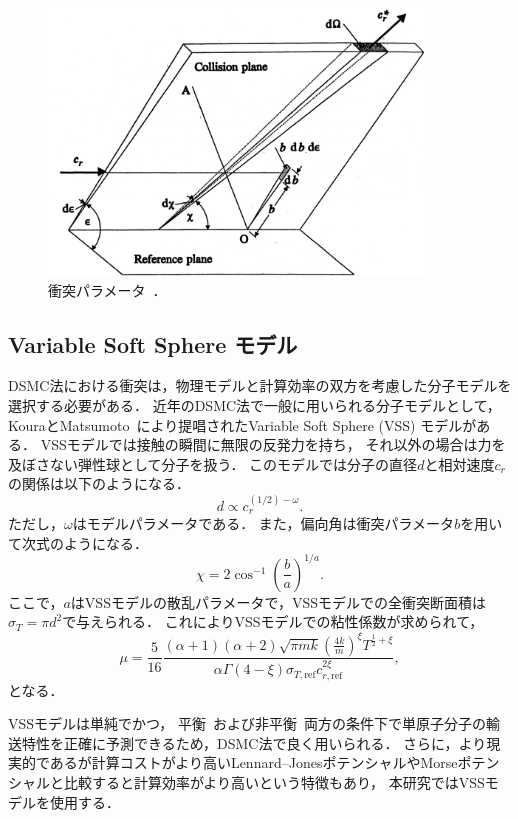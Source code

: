 \begin{figure}
    \centering
    \includegraphics[width=10cm]{fig/dsmc/bird2.jpg}
    \caption{衝突パラメータ~\cite{bird1994molecular}．}
    \label{fig:bird2}
\end{figure}

\subsection{Variable Soft Sphere モデル}
DSMC法における衝突は，物理モデルと計算効率の双方を考慮した分子モデルを選択する必要がある．
近年のDSMC法で一般に用いられる分子モデルとして，
KouraとMatsumoto~\cite{koura1991variable}により提唱されたVariable Soft Sphere (VSS) モデルがある．
VSSモデルでは接触の瞬間に無限の反発力を持ち，
それ以外の場合は力を及ぼさない弾性球として分子を扱う．
このモデルでは分子の直径$d$と相対速度$c_r$の関係は以下のようになる．
\begin{equation}
    d \propto c_r^{(1/2)-\omega}.
\end{equation}
ただし，$\omega$はモデルパラメータである．
また，偏向角は衝突パラメータ$b$を用いて次式のようになる．
\begin{equation}
    \chi = 2\cos^{-1}\left(\dfrac{b}{a}\right)^{1/a}.
\end{equation}
ここで，$a$はVSSモデルの散乱パラメータで，VSSモデルでの全衝突断面積は
$\sigma_T  = \pi d^2$で与えられる．
これによりVSSモデルでの粘性係数が求められて，
\begin{equation}
    \mu=\dfrac{5}{16} \frac{(\alpha+1)(\alpha+2) \sqrt{\pi m k}\left(\frac{4 k}{m}\right)^{\xi} T^{\frac{1}{2}+\xi}}{\alpha \Gamma(4-\xi) \sigma_{T, \mathrm{ref}} c_{r, \mathrm{ref}}^{2 \xi}},
\end{equation}
となる．

VSSモデルは単純でかつ，
平衡~\cite{gallis2004molecular}および非平衡~\cite{gallis2011investigation}両方の条件下で単原子分子の輸送特性を正確に予測できるため，DSMC法で良く用いられる．
さらに，より現実的であるが計算コストがより高いLennard–JonesポテンシャルやMorseポテンシャルと比較すると計算効率がより高いという特徴もあり，
本研究ではVSSモデルを使用する．

